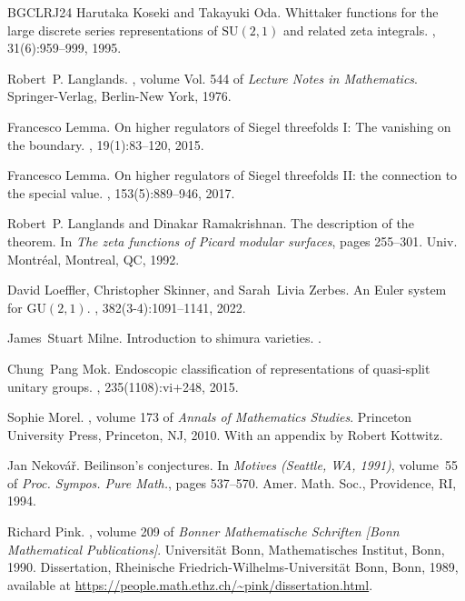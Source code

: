 \documentclass[11pt, a4paper]{amsart}
\theoremstyle{plain}
\theoremstyle{definition}
\numberwithin{equation}{section}
\begin{document}
\begin{thebibliography}{BGCLRJ24}
Harutaka Koseki and Takayuki Oda.
\newblock Whittaker functions for the large discrete series representations of
  {${\mathrm {SU}}(2,1)$} and related zeta integrals.
, 31(6):959--999, 1995.

Robert~P. Langlands.
,
  volume Vol. 544 of {\em Lecture Notes in Mathematics}.
\newblock Springer-Verlag, Berlin-New York, 1976.

Francesco Lemma.
\newblock On higher regulators of {S}iegel threefolds {I}: {T}he vanishing on
  the boundary.
, 19(1):83--120, 2015.

Francesco Lemma.
\newblock On higher regulators of {S}iegel threefolds {II}: the connection to
  the special value.
, 153(5):889--946, 2017.

Robert~P. Langlands and Dinakar Ramakrishnan.
\newblock The description of the theorem.
\newblock In {\em The zeta functions of {P}icard modular surfaces}, pages
  255--301. Univ. Montr\'{e}al, Montreal, QC, 1992.

David Loeffler, Christopher Skinner, and Sarah~Livia Zerbes.
\newblock An {E}uler system for $\mathrm{GU}(2,1)$.
, 382(3-4):1091--1141, 2022.

James~Stuart Milne.
\newblock Introduction to shimura varieties.
.

Chung~Pang Mok.
\newblock Endoscopic classification of representations of quasi-split unitary
  groups.
, 235(1108):vi+248, 2015.

Sophie Morel.
,
  volume 173 of {\em Annals of Mathematics Studies}.
\newblock Princeton University Press, Princeton, NJ, 2010.
\newblock With an appendix by Robert Kottwitz.

Jan Nekov\'{a}\v{r}.
\newblock Beilinson's conjectures.
\newblock In {\em Motives ({S}eattle, {WA}, 1991)}, volume~55 of {\em Proc.
  Sympos. Pure Math.}, pages 537--570. Amer. Math. Soc., Providence, RI, 1994.

Richard Pink.
,
  volume 209 of {\em Bonner Mathematische Schriften [Bonn Mathematical
  Publications]}.
\newblock Universit\"{a}t Bonn, Mathematisches Institut, Bonn, 1990.
\newblock Dissertation, Rheinische Friedrich-Wilhelms-Universit\"{a}t Bonn,
  Bonn, 1989, available at
  \url{https://people.math.ethz.ch/~pink/dissertation.html}.


\end{thebibliography}
\end{document}
